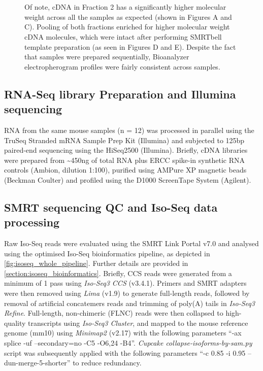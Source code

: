 \begin{figure}[!htp]
{	\\
	\\	 	
	Of note, cDNA in Fraction 2 has a significantly higher molecular weight across all the samples as expected (shown in Figures A and C). Pooling of both fractions enriched for higher molecular weight cDNA molecules, which were intact after performing SMRTbell template preparation (as seen in Figures D and E). Despite the fact that samples were prepared sequentially, Bioanalyzer electropherogram profiles were fairly consistent across samples. 
	}
	\label{fig:isoseq_whole_bioresults}
\end{figure}

\clearpage
\subsection{RNA-Seq library Preparation and Illumina sequencing}
RNA from the same mouse samples (n = 12) was processed in parallel using the TruSeq Stranded mRNA Sample Prep Kit (Illumina) and subjected to 125bp paired-end sequencing using the HiSeq2500 (Illumina)\cite{Castanho2020}. Briefly, cDNA libraries were prepared from \textasciitilde450ng of total RNA plus ERCC spike-in synthetic RNA controls (Ambion, dilution 1:100), purified using AMPure XP magnetic beads (Beckman Coulter) and profiled using the D1000 ScreenTape System (Agilent). 

\subsection{SMRT sequencing QC and Iso-Seq data processing}\label{ch4_methods: isoseq_data}
Raw Iso-Seq reads were evaluated using the SMRT Link Portal v7.0 and analysed using the optimised Iso-Seq bioinformatics pipeline, as depicted in \cref{fig:isoseq_whole_pipeline}. Further details are provided in \cref{section:isoseq_bioinformatics}. Briefly, CCS reads were generated from a minimum of 1 pass using \textit{Iso-Seq3 CCS} (v3.4.1). Primers and SMRT adapters were then removed using \textit{Lima} (v1.9) to generate full-length reads, followed by removal of artificial concatemers reads and trimming of poly(A) tails in \textit{Iso-Seq3 Refine}. Full-length, non-chimeric (FLNC) reads were then collapsed to high-quality transcripts using \textit{Iso-Seq3 Cluster}, and mapped to the mouse reference genome (mm10) using \textit{Minimap2} (v2.17) with the following parameters “-ax splice -uf --secondary=no -C5 -O6,24 -B4”. \textit{ Cupcake collapse-isoforms-by-sam.py} script was subsequently applied with the following parameters  “-c 0.85 -i 0.95 --dun-merge-5-shorter” to reduce redundancy. 

